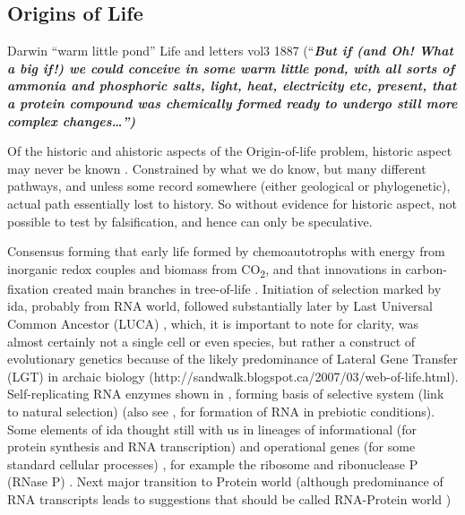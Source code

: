 	
	\subsection{Origins of Life}\label{origins-of-life}
	
	Darwin ``warm little pond'' Life and letters vol3 1887
	(``\emph{\textbf{But if (and Oh! What a big if!) we could conceive in
			some warm little pond, with all sorts of ammonia and phosphoric salts,
			light, heat, electricity etc, present, that a protein compound was
			chemically formed ready to undergo still more complex
			changes\ldots{}'')}} \autocite{Vasas2012}
	
	
	Of the historic and ahistoric aspects of the Origin-of-life problem,
	historic aspect may never be known \autocite{Pross2013}. Constrained by
	what we do know, but many different pathways, and unless some record
	somewhere (either geological or phylogenetic), actual path essentially
	lost to history. So without evidence for historic aspect, not possible
	to test by falsification, and hence can only be speculative.
	
	Consensus forming that early life formed by chemoautotrophs with energy
	from inorganic redox couples and biomass from CO\textsubscript{2}, and
	that innovations in carbon-fixation created main branches in
	tree-of-life \autocite{Braakman2012}. Initiation of selection marked by
	\gls{ida}, probably from RNA world, followed substantially later by Last
	Universal Common Ancestor (LUCA) \autocite{Yarus2011}, which, it is
	important to note for clarity, was almost certainly not a single cell or
	even species, but rather a construct of evolutionary genetics because of
	the likely predominance of Lateral Gene Transfer (LGT) in archaic
	biology (http://sandwalk.blogspot.ca/2007/03/web-of-life.html).
	Self-replicating RNA enzymes shown in \autocite{Lincoln2009}, forming
	basis of selective system (link to natural selection) (also see
	\autocite{Cheng2010}, \autocite{Powner2009} for formation of RNA in
	prebiotic conditions). Some elements of \gls{ida} thought still with us
	in lineages of informational (for protein synthesis and RNA
	transcription) and operational genes (for some standard cellular
	processes) \autocite{Ragan2009}, for example the ribosome and
	ribonuclease P (RNase P) \autocite{Wilson2009}. Next major transition to
	Protein world (although predominance of RNA transcripts leads to
	suggestions that should be called RNA-Protein world
	\autocite{Altman2013})
	
